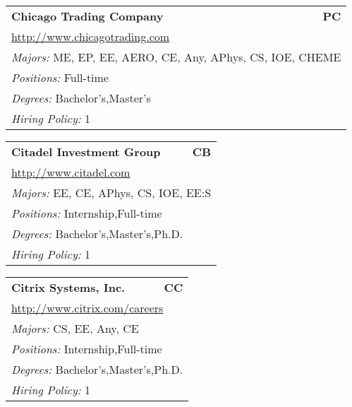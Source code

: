\documentclass[twoside]{article}
\begin{document}
\begin{center}
\begin{multicols}{3}
\begin{FlushLeft}
\begin{minipage}{\columnwidth}
\end{minipage}
 
\begin{minipage}{\columnwidth}\begin{tabularx}{.95\columnwidth}{Xr}
                 {\Large\bf Chicago Trading Company} & {\Large\bf PC}\\
    \multicolumn{2}{p{.95\columnwidth}}{\url{http://www.chicagotrading.com}}\\
    \multicolumn{2}{p{.95\columnwidth}}{\emph{Majors:} ME, EP, EE, AERO, CE, Any, APhys, CS, IOE, CHEME}\\
    \multicolumn{2}{p{.95\columnwidth}}{\emph{Positions:} Full-time}\\
    \multicolumn{2}{p{.95\columnwidth}}{\emph{Degrees:} Bachelor's,Master's}\\
    \multicolumn{2}{p{.95\columnwidth}}{\emph{Hiring Policy:} 1}\\
    \end{tabularx}
    
\end{minipage}
 
\begin{minipage}{\columnwidth}\begin{tabularx}{.95\columnwidth}{Xr}
                 {\Large\bf Citadel Investment Group} & {\Large\bf CB}\\
    \multicolumn{2}{p{.95\columnwidth}}{\url{http://www.citadel.com}}\\
    \multicolumn{2}{p{.95\columnwidth}}{\emph{Majors:} EE, CE, APhys, CS, IOE, EE:S}\\
    \multicolumn{2}{p{.95\columnwidth}}{\emph{Positions:} Internship,Full-time}\\
    \multicolumn{2}{p{.95\columnwidth}}{\emph{Degrees:} Bachelor's,Master's,Ph.D.}\\
    \multicolumn{2}{p{.95\columnwidth}}{\emph{Hiring Policy:} 1}\\
    \end{tabularx}
    
\end{minipage}
 
\begin{minipage}{\columnwidth}\begin{tabularx}{.95\columnwidth}{Xr}
                 {\Large\bf Citrix Systems, Inc.} & {\Large\bf CC}\\
    \multicolumn{2}{p{.95\columnwidth}}{\url{http://www.citrix.com/careers}}\\
    \multicolumn{2}{p{.95\columnwidth}}{\emph{Majors:} CS, EE, Any, CE}\\
    \multicolumn{2}{p{.95\columnwidth}}{\emph{Positions:} Internship,Full-time}\\
    \multicolumn{2}{p{.95\columnwidth}}{\emph{Degrees:} Bachelor's,Master's,Ph.D.}\\
    \multicolumn{2}{p{.95\columnwidth}}{\emph{Hiring Policy:} 1}\\
    \end{tabularx}
    

\end{minipage}
\end{FlushLeft}
\end{multicols}
\end{center}
\end{document}
